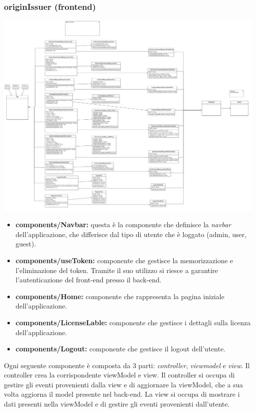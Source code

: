 \subsubsection{originIssuer (frontend)} 
\includegraphics[scale=0.2]{./res/img/frontendissuer.png}
\begin{itemize}
    \item \textbf{components/Navbar:} questa è la componente che definisce la \textit{navbar} dell'applicazione, che differisce dal tipo di utente che è loggato (admin, user, guest).
    \item \textbf{components/useToken:} componente che gestisce la memorizzazione e l'eliminazione del token. Tramite il suo utilizzo si riesce a garantire l'autenticazione del front-end presso il back-end.
    \item \textbf{components/Home:} componente che rappresenta la pagina iniziale dell'applicazione.
    \item \textbf{components/LicenseLable:} componente che gestisce i dettagli sulla licenza dell'applicazione.
    \item \textbf{components/Logout:} componente che gestisce il logout dell'utente.
\end{itemize}

Ogni seguente componente è composta da 3 parti: \textit{controller}, \textit{viewmodel} e \textit{view}. Il controller crea la corrispondente
viewModel e view. Il controller si occupa di gestire gli eventi provenienti dalla view e di aggiornare la viewModel, che a sua volta aggiorna 
il model presente nel back-end. La view si occupa di mostrare i dati presenti nella viewModel e di gestire gli eventi provenienti dall'utente.


